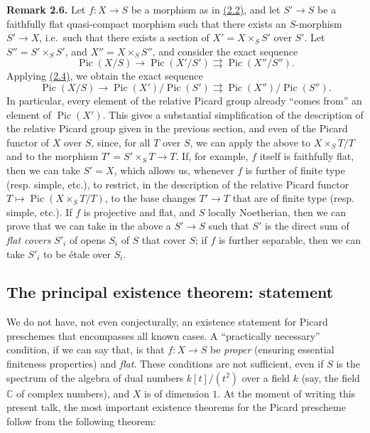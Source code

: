\documentclass{article}
\newenvironment{rmenv}[1]
  {\phantomsection\par\smallskip\noindent\textbf{#1.}\rmfamily}
  {\par\smallskip}
\newcommand{\oldpage}[1]{\marginpar{\footnotesize$\Big\vert$ \textit{p.~#1}}}
\theoremstyle{definition}
\theoremstyle{definition}
\theoremstyle{definition}
\theoremstyle{definition}
\theoremstyle{remark}
\begin{document}
\leavevmode{}%
\begin{rmenv}{Remark 2.6}
Let \(f\colon X\to S\) be a morphism as in \protect\hyperlink{fga-3-v-proposition-2.2}{(2.2)}, and let \(S'\to S\) be a faithfully flat quasi-compact morphism such that there exists an \(S\)-morphism \(S'\to X\), i.e.~such that there exists a section of \(X'=X\times_S S'\) over \(S'\).
\oldpage{232-06}Let \(S''=S'\times_S S'\), and \(X''=X\times_S S''\), and consider the exact sequence
\[
  \operatorname{Pic}(X/S)
  \to \operatorname{Pic}(X'/S')
  \rightrightarrows \operatorname{Pic}(X''/S'').
\]
Applying \protect\hyperlink{fga-3-v-corollary-2.4}{(2.4)}, we obtain the exact sequence
\[
  \operatorname{Pic}(X/S)
  \to \operatorname{Pic}(X')/\operatorname{Pic}(S')
  \rightrightarrows \operatorname{Pic}(X'')/\operatorname{Pic}(S'').
\]
In particular, every element of the relative Picard group already ``comes from'' an element of \(\operatorname{Pic}(X')\).
This gives a substantial simplification of the description of the relative Picard group given in the previous section, and even of the Picard functor of \(X\) over \(S\), since, for all \(T\) over \(S\), we can apply the above to \(X\times_S T/T\) and to the morphism \(T'=S'\times_S T\to T\).
If, for example, \(f\) itself is faithfully flat, then we can take \(S'=X\), which allows us, whenever \(f\) is further of finite type (resp. simple, etc.), to restrict, in the description of the relative Picard functor \(T\mapsto\operatorname{Pic}(X\times_S T/T)\), to the base changes \(T'\to T\) that are of finite type (resp. simple, etc.).
If \(f\) is projective and flat, and \(S\) locally Noetherian, then we can prove that we can take in the above a \(S'\to S\) such that \(S'\) is the direct sum of \emph{flat covers} \(S'_i\) of opens \(S_i\) of \(S\) that cover \(S\);
if \(f\) is further separable, then we can take \(S'_i\) to be étale over \(S_i\).

\end{rmenv}

\hypertarget{fga-3-v-section-3}{%
\subsection{The principal existence theorem: statement}\label{fga-3-v-section-3}}

We do not have, not even conjecturally, an existence statement for Picard preschemes that encompasses all known cases.
A ``practically necessary'' condition, if we can say that, is that \(f\colon X\to S\) be \emph{proper} (ensuring essential finiteness properties) and \emph{flat}.
These conditions are not sufficient, even if \(S\) is the spectrum of the algebra of dual numbers \(k[t]/(t^2)\) over a field \(k\) (say, the field \(\mathbb{C}\) of complex numbers), and \(X\) is of dimension \(1\).
At the moment of writing this present talk, the most important existence theorems for the Picard prescheme follow from the following theorem:
\end{document}
